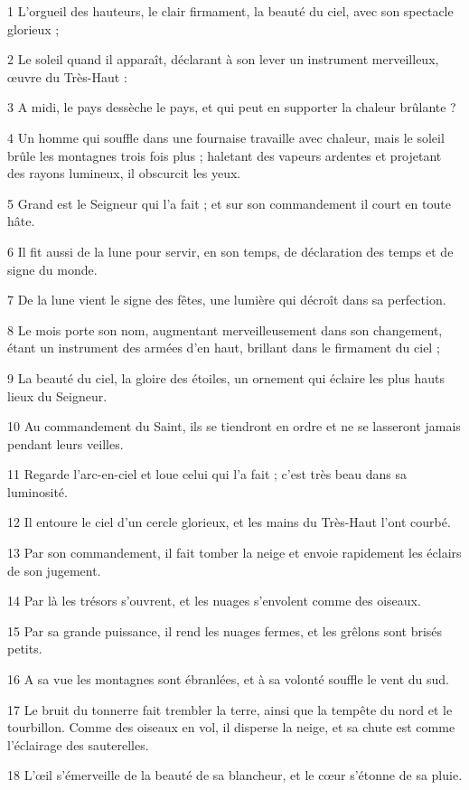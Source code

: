 \par 1 L'orgueil des hauteurs, le clair firmament, la beauté du ciel, avec son spectacle glorieux ;
\par 2 Le soleil quand il apparaît, déclarant à son lever un instrument merveilleux, œuvre du Très-Haut :
\par 3 A midi, le pays dessèche le pays, et qui peut en supporter la chaleur brûlante ?
\par 4 Un homme qui souffle dans une fournaise travaille avec chaleur, mais le soleil brûle les montagnes trois fois plus ; haletant des vapeurs ardentes et projetant des rayons lumineux, il obscurcit les yeux.
\par 5 Grand est le Seigneur qui l'a fait ; et sur son commandement il court en toute hâte.
\par 6 Il fit aussi de la lune pour servir, en son temps, de déclaration des temps et de signe du monde.
\par 7 De la lune vient le signe des fêtes, une lumière qui décroît dans sa perfection.
\par 8 Le mois porte son nom, augmentant merveilleusement dans son changement, étant un instrument des armées d'en haut, brillant dans le firmament du ciel ;
\par 9 La beauté du ciel, la gloire des étoiles, un ornement qui éclaire les plus hauts lieux du Seigneur.
\par 10 Au commandement du Saint, ils se tiendront en ordre et ne se lasseront jamais pendant leurs veilles.
\par 11 Regarde l'arc-en-ciel et loue celui qui l'a fait ; c'est très beau dans sa luminosité.
\par 12 Il entoure le ciel d'un cercle glorieux, et les mains du Très-Haut l'ont courbé.
\par 13 Par son commandement, il fait tomber la neige et envoie rapidement les éclairs de son jugement.
\par 14 Par là les trésors s'ouvrent, et les nuages ​​s'envolent comme des oiseaux.
\par 15 Par sa grande puissance, il rend les nuages ​​fermes, et les grêlons sont brisés petits.
\par 16 A sa vue les montagnes sont ébranlées, et à sa volonté souffle le vent du sud.
\par 17 Le bruit du tonnerre fait trembler la terre, ainsi que la tempête du nord et le tourbillon. Comme des oiseaux en vol, il disperse la neige, et sa chute est comme l'éclairage des sauterelles.
\par 18 L'œil s'émerveille de la beauté de sa blancheur, et le cœur s'étonne de sa pluie.
